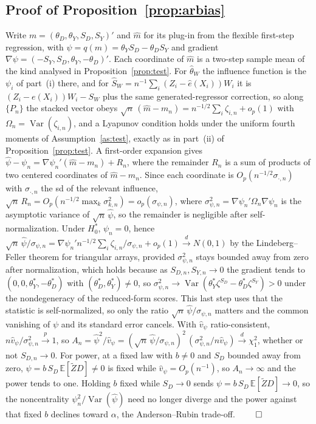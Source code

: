 \documentclass[preprint,11pt,authoryear]{elsarticle}
\theoremstyle{definition}
\newcommand{\E}{\mathbb{E}}
\newcommand{\Var}{\operatorname{Var}}
\newcommand{\Ztil}{\tilde{Z}}
\newcommand{\convd}{\overset{d}{\longrightarrow}}
\newcommand{\convp}{\overset{p}{\longrightarrow}}
\begin{document}
\subsection*{Proof of Proposition~\ref{prop:arbias}}
Write $m=(\theta_D,\theta_Y,S_D,S_Y)'$ and $\hat m$ for its plug-in from the flexible
first-step regression, with $\psi=q(m)=\theta_Y S_D-\theta_D S_Y$ and gradient
$\nabla\psi=(-S_Y,S_D,\theta_Y,-\theta_D)'$. Each coordinate of $\hat m$ is a two-step
sample mean of the kind analysed in Proposition~\ref{prop:test}. For $\hat\theta_W$ the influence function is the
$\psi_i$ of part~(i) there, and for $\hat S_W=n^{-1}\sum_i(Z_i-\hat
e(X_i))W_i$ it is $(Z_i-e(X_i))W_i-S_W$ plus the same generated-regressor correction,
so along $\{P_n\}$ the stacked vector obeys
$\sqrt n\,(\hat m-m_n)=n^{-1/2}\sum_i\zeta_{i,n}+o_p(1)$ with
$\Omega_n=\Var(\zeta_{i,n})$, and a Lyapunov condition holds under the uniform fourth
moments of Assumption~\ref{as:test}, exactly as in
part~(ii) of Proposition~\ref{prop:test}. A first-order expansion gives
$\hat\psi-\psi_n=\nabla\psi_n'(\hat m-m_n)+R_n$, where the remainder $R_n$ is a sum of
products of two centered coordinates of $\hat m-m_n$. Since each coordinate is
$O_p(n^{-1/2}\sigma_{\cdot,n})$ with $\sigma_{\cdot,n}$ the sd of the relevant
influence, $\sqrt n\,R_n=O_p(n^{-1/2}\max_k\sigma_{k,n}^2)=o_p(\sigma_{\psi,n})$, where
$\sigma_{\psi,n}^2=\nabla\psi_n'\Omega_n\nabla\psi_n$ is the asymptotic variance of
$\sqrt n\,\hat\psi$, so the remainder is negligible after self-normalization. Under
$H_0^{\ast}$, $\psi_n=0$, hence
$\sqrt n\,\hat\psi/\sigma_{\psi,n}=\nabla\psi_n'n^{-1/2}\sum_i\zeta_{i,n}/\sigma_{\psi,n}+o_p(1)
\convd N(0,1)$
by the Lindeberg--Feller theorem for triangular arrays, provided
$\sigma_{\psi,n}^2$ stays bounded away from zero after normalization, which holds
because as $S_{D,n},S_{Y,n}\to0$ the gradient tends to $(0,0,\theta_Y^\ast,-\theta_D^\ast)$
with $(\theta_D^\ast,\theta_Y^\ast)\neq0$, so
$\sigma_{\psi,n}^2\to\Var(\theta_Y^\ast\zeta^{S_D}-\theta_D^\ast\zeta^{S_Y})>0$ under
the nondegeneracy of the reduced-form scores. This last step uses that the statistic
is self-normalized, so only the ratio $\sqrt n\,\hat\psi/\sigma_{\psi,n}$ matters and
the common vanishing of $\psi$ and its standard error cancels. With $\hat v_\psi$
ratio-consistent, $n\hat v_\psi/\sigma_{\psi,n}^2\convp1$, so
$A_n=\hat\psi^2/\hat v_\psi=(\sqrt n\,\hat\psi/\sigma_{\psi,n})^2\,(\sigma_{\psi,n}^2/n\hat v_\psi)
\convd\chi^2_1$, whether or not $S_{D,n}\to0$. For power, at a fixed law with
$b\neq0$ and $S_D$ bounded away from zero, $\psi=b\,S_D\,\E[\Ztil D]\neq0$ is fixed
while $\hat v_\psi=O_p(n^{-1})$, so $A_n\to\infty$ and the power tends to one. Holding
$b$ fixed while $S_D\to0$ sends $\psi=b\,S_D\,\E[\Ztil D]\to0$, so the noncentrality
$\psi_n^2/\Var(\hat\psi)$ need no longer diverge and the power against that fixed $b$
declines toward $\alpha$, the Anderson--Rubin trade-off. \hfill$\qed$
\end{document}
